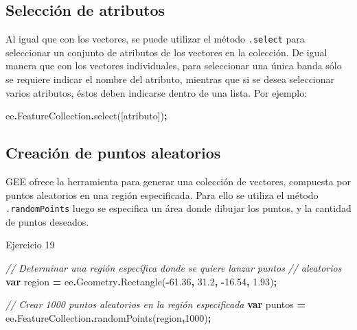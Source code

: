 \documentclass[
  12pt,
  letterpaper,
  twoside]{book}
\newenvironment{Shaded}{\begin{snugshade}}{\end{snugshade}}
\newcommand{\AttributeTok}[1]{\textcolor[rgb]{0.77,0.63,0.00}{#1}}
\newcommand{\CommentTok}[1]{\textcolor[rgb]{0.56,0.35,0.01}{\textit{#1}}}
\newcommand{\DecValTok}[1]{\textcolor[rgb]{0.00,0.00,0.81}{#1}}
\newcommand{\FloatTok}[1]{\textcolor[rgb]{0.00,0.00,0.81}{#1}}
\newcommand{\FunctionTok}[1]{\textcolor[rgb]{0.00,0.00,0.00}{#1}}
\newcommand{\KeywordTok}[1]{\textcolor[rgb]{0.13,0.29,0.53}{\textbf{#1}}}
\newcommand{\NormalTok}[1]{#1}
\newcommand{\OperatorTok}[1]{\textcolor[rgb]{0.81,0.36,0.00}{\textbf{#1}}}
\newcommand{\StringTok}[1]{\textcolor[rgb]{0.31,0.60,0.02}{#1}}
\begin{document}
\hypertarget{selecciuxf3n-de-atributos}{%
\subsection*{Selección de atributos}\label{selecciuxf3n-de-atributos}}

Al igual que con los vectores, se puede utilizar el método \texttt{.select} para seleccionar un conjunto de atributos de los vectores en la colección. De igual manera que con los vectores individuales, para seleccionar una única banda sólo se requiere indicar el nombre del atributo, mientras que si se desea seleccionar varios atributos, éstos deben indicarse dentro de una lista. Por ejemplo:

\begin{Shaded}
\begin{Highlighting}[]
\NormalTok{ee}\OperatorTok{.}\AttributeTok{FeatureCollection}\OperatorTok{.}\FunctionTok{select}\NormalTok{([}\StringTok{\textquotesingle{}atributo\textquotesingle{}}\NormalTok{])}\OperatorTok{;}
\end{Highlighting}
\end{Shaded}

\hypertarget{creaciuxf3n-de-puntos-aleatorios}{%
\subsection*{Creación de puntos aleatorios}\label{creaciuxf3n-de-puntos-aleatorios}}

GEE ofrece la herramienta para generar una colección de vectores, compuesta por puntos aleatorios en una región especificada. Para ello se utiliza el método \texttt{.randomPoints} luego se especifica un área donde dibujar los puntos, y la cantidad de puntos deseados.

Ejercicio 19

\begin{Shaded}
\begin{Highlighting}[]
\CommentTok{// Determinar una región específica donde se quiere lanzar puntos }
\CommentTok{// aleatorios}
\KeywordTok{var}\NormalTok{ region }\OperatorTok{=}\NormalTok{ ee}\OperatorTok{.}\AttributeTok{Geometry}\OperatorTok{.}\FunctionTok{Rectangle}\NormalTok{(}\OperatorTok{{-}}\FloatTok{61.36}\OperatorTok{,} \FloatTok{31.2}\OperatorTok{,} \OperatorTok{{-}}\FloatTok{16.54}\OperatorTok{,} \FloatTok{1.93}\NormalTok{)}\OperatorTok{;}

\CommentTok{// Crear 1000 puntos aleatorios en la región especificada}
\KeywordTok{var}\NormalTok{ puntos }\OperatorTok{=}\NormalTok{ ee}\OperatorTok{.}\AttributeTok{FeatureCollection}\OperatorTok{.}\FunctionTok{randomPoints}\NormalTok{(region}\OperatorTok{,}\DecValTok{1000}\NormalTok{)}\OperatorTok{;}
\end{Highlighting}
\end{Shaded}
\end{document}
